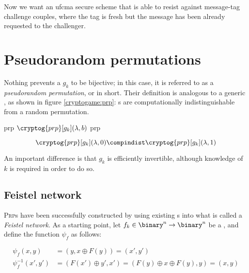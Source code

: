Now we want an ufcma secure scheme that is able to resist against message-tag challenge couples, where the tag is fresh but the message has been already requested to the challenger.

\section{Pseudorandom permutations}

Nothing prevents a \prf{} $g_k$ to be bijective; in this case, it is referred to as a \emph{pseudorandom permutation}, or \prp{} in short. Their definition is analogous to a generic \prf, as shown in figure \ref{cryptogame:prp}: \prp{}s are computationally indistinguishable from a random permutation.

\begin{cryptogame}
    {prp}
    {$\cryptog{prp}[g_k](\lambda, b)$}
    {prp}


    \cseqdelay
    \cseqbeginloop
    \cseqendloop
    \cseqdelay

    
\end{cryptogame}

\[
    \cryptog{prp}[g_k](\lambda, 0) \compindist \cryptog{prp}[g_k](\lambda, 1)
\]

An important difference is that $g_k$ is efficiently invertible, although knowledge of $k$ is required in order to do so.

\subsection{Feistel network}

\textsc{Prp}s have been successfully constructed by using existing \prf{}s into what is called a \emph{Feistel network}. As a starting point, let $f_k \in \binary^n \to \binary^n$ be a \prf, and define the function $\psi_f$ as follows:

\begin{align*}
    \psi_f(x, y)        &= (y, x \oplus F(y)) = (x', y')                                  \\
    \psi^{-1}_f(x', y') &= (F(x') \oplus y', x') = (F(y) \oplus x \oplus F(y), y) = (x, y)    \\
\end{align*}

